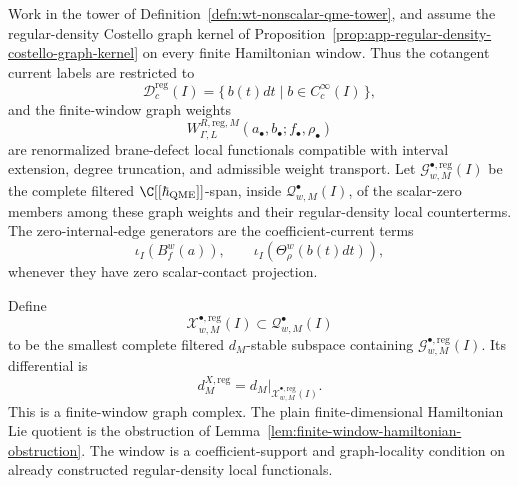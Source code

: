 \begin{defn}
\label{defn:wt-regular-density-closed-exchange-complex}
  Work in the tower of
  Definition~\ref{defn:wt-nonscalar-qme-tower}, and assume the
  regular-density Costello graph kernel of
  Proposition~\ref{prop:app-regular-density-costello-graph-kernel} on
  every finite Hamiltonian window.  Thus the cotangent current labels are
  restricted to
  \[
    \mathcal D^{\mathrm{reg}}_c(I)
      =\{\,b(t)dt\mid b\in C^\infty_c(I)\,\},
  \]
  and the finite-window graph weights
  \[
    W^{R,\mathrm{reg},M}_{\Gamma,L}
      (a_\bullet,b_\bullet;f_\bullet,\rho_\bullet)
  \]
  are renormalized brane-defect local functionals compatible with
  interval extension, degree truncation, and admissible weight transport.
  Let \(\mathcal G^{\bullet,\mathrm{reg}}_{w,M}(I)\) be the complete
  filtered \(\C[[\hbar_{\mathrm{QME}}]]\)-span, inside
  \(\mathcal Q^\bullet_{w,M}(I)\), of the scalar-zero members among these
  graph weights and their regular-density local counterterms.  The
  zero-internal-edge generators are the coefficient-current terms
  \[
    \iota_I(B^w_f(a)),\qquad
    \iota_I(\Theta^w_\rho(b(t)dt)),
  \]
  whenever they have zero scalar-contact projection.

  Define
  \[
    \mathcal X^{\bullet,\mathrm{reg}}_{w,M}(I)
      \subset \mathcal Q^\bullet_{w,M}(I)
  \]
  to be the smallest complete filtered \(d_M\)-stable subspace containing
  \(\mathcal G^{\bullet,\mathrm{reg}}_{w,M}(I)\).  Its differential is
  \[
    d^{X,\mathrm{reg}}_M=d_M|_{\mathcal X^{\bullet,\mathrm{reg}}_{w,M}(I)}.
  \]
  This is a finite-window graph complex.  The plain finite-dimensional
  Hamiltonian Lie quotient is the obstruction of
  Lemma~\ref{lem:finite-window-hamiltonian-obstruction}.  The window is a
  coefficient-support and graph-locality condition on already constructed
  regular-density local functionals.
\end{defn}

